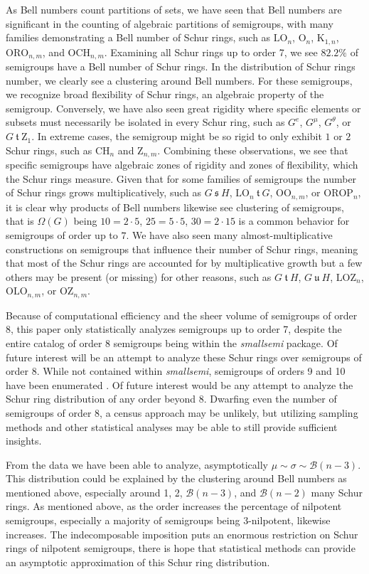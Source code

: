 \documentclass{article}
\theoremstyle{plain}
\theoremstyle{definition}
\newcommand{\B}{\mathscr{B}}
\renewcommand{\O}{\mathrm{O}}
\newcommand{\K}{\mathrm{K}}
\newcommand{\LO}{\mathrm{LO}}
\newcommand{\ORO}{\mathrm{ORO}}
\newcommand{\OLO}{\mathrm{OLO}}
\newcommand{\OROP}{\mathrm{OROP}}
\newcommand{\LOZ}{\mathrm{LOZ}}
\newcommand{\CH}{\mathrm{CH}}
\newcommand{\z}{\mathrm{Z}}
\newcommand{\OO}{\mathrm{OO}}
\newcommand{\OCH}{\mathrm{OCH}}
\newcommand{\OZ}{\mathrm{OZ}}
\newcommand{\s}{\ \mathfrak{s}\ }
\renewcommand{\t}{\ \mathfrak{t}\ }
\renewcommand{\u}{\ \mathfrak{u}\ }
\begin{document}
As Bell numbers count partitions of sets, we have seen that Bell numbers are significant in the counting of algebraic partitions of semigroups, with many families demonstrating a Bell number of Schur rings, such as $\LO_n$, $\O_n$, $\K_{1,n}$, $\ORO_{n,m}$, and $\OCH_{n,m}$. Examining all Schur rings up to order 7, we see $82.2\%$ of semigroups have a Bell number of Schur rings. In the distribution of Schur rings number, we clearly see a clustering around Bell numbers. For these semigroups, we recognize broad flexibility of Schur rings, an algebraic property of the semigroup. Conversely, we have also seen great rigidity where specific elements or subsets must necessarily be isolated in every Schur ring, such as $G^e$, $G^\mu$, $G^\theta$, or $G\t \z_1$. In extreme cases, the semigroup might be so rigid to only exhibit $1$ or $2$ Schur rings, such as $\CH_n$ and $\z_{n,m}$. Combining these observations, we see that specific semigroups have algebraic zones of rigidity and zones of flexibility, which the Schur rings measure. Given that for some families of semigroups the number of Schur rings grows multiplicatively, such as $G\s H$, $\LO_n\t G$, $\OO_{n,m}$, or $\OROP_n$, it is clear why products of Bell numbers likewise see clustering of semigroups, that is $\Omega(G) $ being $10=2\cdot 5$, $25 = 5\cdot 5$, $30=2\cdot 15$ is a common behavior for semigroups of order up to $7$. We have also seen many almost-multiplicative constructions on semigroups that influence their number of Schur rings, meaning that most of the Schur rings are accounted for by multiplicative growth but a few others may be present (or missing) for other reasons, such as $G\t H$, $G\u H$, $\LOZ_n$, $\OLO_{n,m}$, or $\OZ_{n,m}$.

Because of computational efficiency and the sheer volume of semigroups of order 8, this paper only statistically analyzes semigroups up to order 7, despite the entire catalog of order 8 semigroups being within the \emph{smallsemi} package. Of future interest will be an attempt to analyze these Schur rings over semigroups of order 8. While not contained within \emph{smallsemi}, semigroups of orders 9 and 10 have been enumerated \cite{Distler}. Of future interest would be any attempt to analyze the Schur ring distribution of any order beyond 8. Dwarfing even the number of semigroups of order 8, a census approach may be unlikely, but utilizing sampling methods and other statistical analyses may be able to still provide sufficient insights.

From the data we have been able to analyze, asymptotically $\mu\sim \sigma \sim \B(n-3)$. This distribution could be explained by the clustering around Bell numbers as mentioned above, especially around 1, 2, $\B(n-3)$, and $\B(n-2)$ many Schur rings. As mentioned above, as the order increases the percentage of nilpotent semigroups, especially a majority of semigroups being $3$-nilpotent, likewise increases. The indecomposable imposition puts an enormous restriction on Schur rings of nilpotent semigroups, there is hope that statistical methods can provide an asymptotic approximation of this Schur ring distribution.
\end{document}
